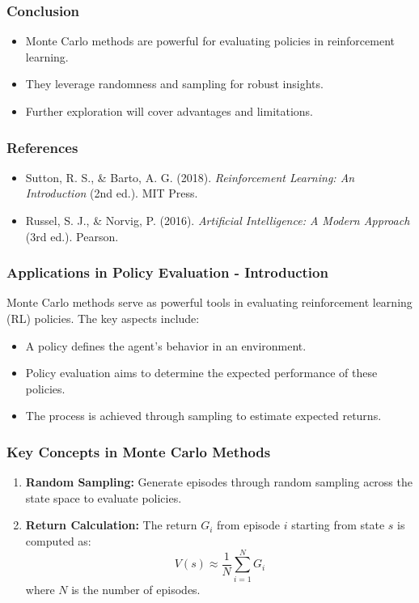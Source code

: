 \documentclass[aspectratio=169]{beamer}
\begin{document}
\begin{frame}[fragile]
    \frametitle{Conclusion}
    \begin{itemize}
        \item Monte Carlo methods are powerful for evaluating policies in reinforcement learning.
        \item They leverage randomness and sampling for robust insights.
        \item Further exploration will cover advantages and limitations.
    \end{itemize}
\end{frame}

\begin{frame}[fragile]
    \frametitle{References}
    \begin{itemize}
        \item Sutton, R. S., \& Barto, A. G. (2018). \textit{Reinforcement Learning: An Introduction} (2nd ed.). MIT Press.
        \item Russel, S. J., \& Norvig, P. (2016). \textit{Artificial Intelligence: A Modern Approach} (3rd ed.). Pearson.
    \end{itemize}
\end{frame}

\begin{frame}[fragile]
    \frametitle{Applications in Policy Evaluation - Introduction}
    Monte Carlo methods serve as powerful tools in evaluating reinforcement learning (RL) policies. The key aspects include:
    \begin{itemize}
        \item A policy defines the agent's behavior in an environment.
        \item Policy evaluation aims to determine the expected performance of these policies.
        \item The process is achieved through sampling to estimate expected returns.
    \end{itemize}
\end{frame}

\begin{frame}[fragile]
    \frametitle{Key Concepts in Monte Carlo Methods}
    \begin{enumerate}
        \item \textbf{Random Sampling:} Generate episodes through random sampling across the state space to evaluate policies.
        \item \textbf{Return Calculation:} The return \( G_i \) from episode \( i \) starting from state \( s \) is computed as:
        \begin{equation}
            V(s) \approx \frac{1}{N} \sum_{i=1}^{N} G_i
        \end{equation}
        where \( N \) is the number of episodes.
    \end{enumerate}
\end{frame}
\end{document}
